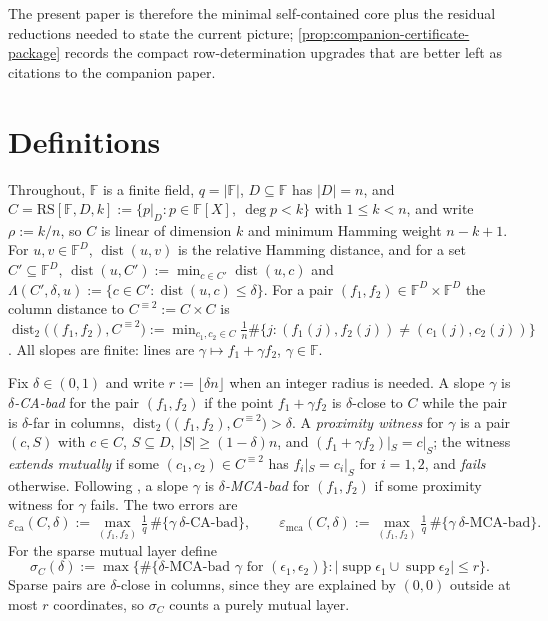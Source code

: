 \documentclass[11pt]{amsart}
\theoremstyle{definition}
\theoremstyle{remark}
\newcommand{\F}{\mathbb{F}}
\newcommand{\RS}{\mathrm{RS}}
\newcommand{\dist}{\operatorname{dist}}
\newcommand{\supp}{\operatorname{supp}}
\newcommand{\eca}{\varepsilon_{\mathrm{ca}}}
\newcommand{\emca}{\varepsilon_{\mathrm{mca}}}
\newcommand{\Lst}{\Lambda}
\begin{document}
The present paper is therefore the minimal self-contained core plus the residual reductions needed to state the current picture; \cref{prop:companion-certificate-package} records the compact row-determination upgrades that are better left as citations to the companion paper.

\section{Definitions}\label{sec:defs}

Throughout, $\F$ is a finite field, $q=|\F|$, $D\subseteq\F$ has $|D|=n$, and $C=\RS[\F,D,k]:=\{p|_D:p\in\F[X],\ \deg p<k\}$ with $1\le k<n$, and write $\rho:=k/n$, so $C$ is linear of dimension $k$ and minimum Hamming weight $n-k+1$. For $u,v\in\F^D$, $\dist(u,v)$ is the relative Hamming distance, and for a set $C'\subseteq\F^D$, $\dist(u,C'):=\min_{c\in C'}\dist(u,c)$ and $\Lst(C',\delta,u):=\{c\in C':\dist(u,c)\le\delta\}$. For a pair $(f_1,f_2)\in\F^D\times\F^D$ the column distance to $C^{\equiv2}:=C\times C$ is $\dist_2\bigl((f_1,f_2),C^{\equiv2}\bigr):=\min_{c_1,c_2\in C}\frac1n\#\{j:(f_1(j),f_2(j))\ne(c_1(j),c_2(j))\}$. All slopes are finite: lines are $\gamma\mapsto f_1+\gamma f_2$, $\gamma\in\F$.

Fix $\delta\in(0,1)$ and write $r:=\lfloor\delta n\rfloor$ when an integer radius is needed. A slope $\gamma$ is \emph{$\delta$-CA-bad} for the pair $(f_1,f_2)$ if the point $f_1+\gamma f_2$ is $\delta$-close to $C$ while the pair is $\delta$-far in columns, $\dist_2\bigl((f_1,f_2),C^{\equiv2}\bigr)>\delta$. A \emph{proximity witness} for $\gamma$ is a pair $(c,S)$ with $c\in C$, $S\subseteq D$, $|S|\ge(1-\delta)n$, and $(f_1+\gamma f_2)|_S=c|_S$; the witness \emph{extends mutually} if some $(c_1,c_2)\in C^{\equiv2}$ has $f_i|_S=c_i|_S$ for $i=1,2$, and \emph{fails} otherwise. Following \cite[Defs.~4.1, 4.3]{ABF26}, a slope $\gamma$ is \emph{$\delta$-MCA-bad} for $(f_1,f_2)$ if some proximity witness for $\gamma$ fails. The two errors are
\[
\eca(C,\delta):=\max_{(f_1,f_2)}\tfrac1q\,\#\{\gamma\ \text{$\delta$-CA-bad}\},
\qquad
\emca(C,\delta):=\max_{(f_1,f_2)}\tfrac1q\,\#\{\gamma\ \text{$\delta$-MCA-bad}\}.
\]
For the sparse mutual layer define
\[
\sigma_C(\delta):=\max\bigl\{\#\{\delta\text{-MCA-bad }\gamma\text{ for }(\epsilon_1,\epsilon_2)\}:
|\supp\epsilon_1\cup\supp\epsilon_2|\le r\bigr\}.
\]
Sparse pairs are $\delta$-close in columns, since they are explained by $(0,0)$ outside at most $r$ coordinates, so $\sigma_C$ counts a purely mutual layer.
\end{document}
